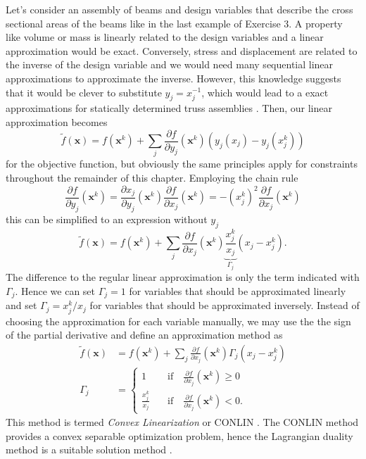 Let's consider an assembly of beams and design variables that describe the cross sectional areas of the beams like in the last example of Exercise 3. A property like volume or mass is linearly related to the design variables and a linear approximation would be exact. Conversely, stress and displacement are related to the inverse of the design variable and we would need many sequential linear approximations to approximate the inverse.  However, this knowledge suggests that it would be clever to substitute $y_j = x^{-1}_j$, which would lead to a exact approximations for statically determined truss assemblies \cite{Christensen2008}. 
Then, our linear approximation becomes 
\begin{equation}
    \tilde{f}(\mathbf{x}) = f(\mathbf{x}^k) + \sum_j \frac{\partial f}{\partial y_j}(\mathbf{x}^k) \left(y_j(x_j) - y_j(x^k_j) \right)
\end{equation}
for the objective function, but obviously the same principles apply for constraints throughout the remainder of this chapter.
Employing the chain rule
\begin{equation}
    \frac{\partial f}{\partial y_j} (\mathbf{x}^k) 
    = \frac{\partial x_j}{\partial y_j}(\mathbf{x}^k) \frac{\partial f}{\partial x_j} (\mathbf{x}^k)   
    = -(x^k_j)^2 \frac{\partial f}{\partial x_j}(\mathbf{x}^k) 
\end{equation}
this can be simplified to an expression without $y_j$
\begin{equation}
    \tilde{f}(\mathbf{x}) = f(\mathbf{x}^k) + \sum_j \frac{\partial f}{\partial x_j}(\mathbf{x}^k) \underbrace{\frac{x^k_j}{x_j}}_{\Gamma_j} \left(x_j - x^k_j \right). 
\end{equation}
The difference to the regular linear approximation is only the term indicated with $\Gamma_j$. Hence we can set $\Gamma_j = 1$ for variables that should be approximated linearly and set $\Gamma_j = x^k_j / x_j$ for variables that should be approximated inversely. Instead of choosing the approximation for each variable manually, we may use the the sign of the partial derivative and define an approximation method as 
\begin{align}
    \tilde{f}(\mathbf{x}) &= f(\mathbf{x}^k) + \sum_j \frac{\partial f}{\partial x_j}(\mathbf{x}^k) \Gamma_j \left(x_j - x^k_j \right) \\
    \Gamma_j &= 
    \begin{cases}
        1 &\quad \text{if} \quad \frac{\partial f}{\partial x_j} (\mathbf{x}^k) \ge 0 \\
        \frac{x^k_j}{x_j} &\quad \text{if} \quad \frac{\partial f}{\partial x_j} (\mathbf{x}^k) < 0.
    \end{cases}
\end{align}
This method is termed \emph{Convex Linearization} or CONLIN \cite{Fleury1989}. The CONLIN method provides a convex separable optimization problem, hence the Lagrangian duality method is a suitable solution method  \cite{Christensen2008,Harzheim2014}.

